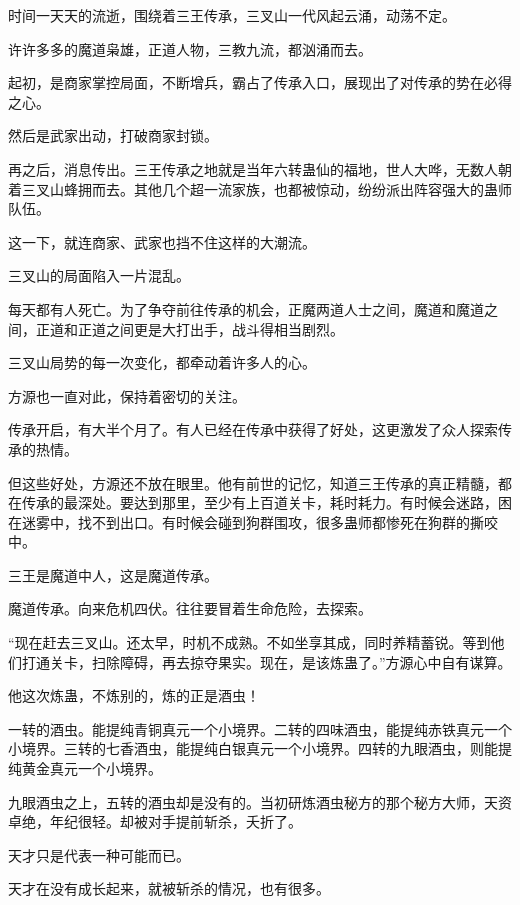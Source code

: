 
\begin{this_body}

时间一天天的流逝，围绕着三王传承，三叉山一代风起云涌，动荡不定。

许许多多的魔道枭雄，正道人物，三教九流，都汹涌而去。

起初，是商家掌控局面，不断增兵，霸占了传承入口，展现出了对传承的势在必得之心。

然后是武家出动，打破商家封锁。

再之后，消息传出。三王传承之地就是当年六转蛊仙的福地，世人大哗，无数人朝着三叉山蜂拥而去。其他几个超一流家族，也都被惊动，纷纷派出阵容强大的蛊师队伍。

这一下，就连商家、武家也挡不住这样的大潮流。

三叉山的局面陷入一片混乱。

每天都有人死亡。为了争夺前往传承的机会，正魔两道人士之间，魔道和魔道之间，正道和正道之间更是大打出手，战斗得相当剧烈。

三叉山局势的每一次变化，都牵动着许多人的心。

方源也一直对此，保持着密切的关注。

传承开启，有大半个月了。有人已经在传承中获得了好处，这更激发了众人探索传承的热情。

但这些好处，方源还不放在眼里。他有前世的记忆，知道三王传承的真正精髓，都在传承的最深处。要达到那里，至少有上百道关卡，耗时耗力。有时候会迷路，困在迷雾中，找不到出口。有时候会碰到狗群围攻，很多蛊师都惨死在狗群的撕咬中。

三王是魔道中人，这是魔道传承。

魔道传承。向来危机四伏。往往要冒着生命危险，去探索。

“现在赶去三叉山。还太早，时机不成熟。不如坐享其成，同时养精蓄锐。等到他们打通关卡，扫除障碍，再去掠夺果实。现在，是该炼蛊了。”方源心中自有谋算。

他这次炼蛊，不炼别的，炼的正是酒虫！

一转的酒虫。能提纯青铜真元一个小境界。二转的四味酒虫，能提纯赤铁真元一个小境界。三转的七香酒虫，能提纯白银真元一个小境界。四转的九眼酒虫，则能提纯黄金真元一个小境界。

九眼酒虫之上，五转的酒虫却是没有的。当初研炼酒虫秘方的那个秘方大师，天资卓绝，年纪很轻。却被对手提前斩杀，夭折了。

天才只是代表一种可能而已。

天才在没有成长起来，就被斩杀的情况，也有很多。


\end{this_body}
